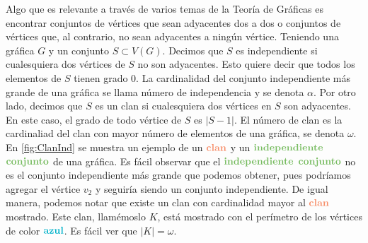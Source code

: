     Algo que es relevante a trav\'es de varios temas de la Teor\'ia de
     Gr\'aficas es encontrar conjuntos de v\'ertices que sean adyacentes dos a
     dos o conjuntos de v\'ertices que, al contrario, no sean adyacentes a
     ning\'un v\'ertice. Teniendo una gr\'afica $G$ y un conjunto $S \subset
     V(G)$. Decimos que $S$ es independiente si cualesquiera dos v\'ertices de
     $S$ no son adyacentes. Esto quiere decir que todos los elementos de $S$
     tienen grado $0$. La cardinalidad del conjunto independiente m\'as grande
     de una gr\'afica se llama n\'umero de independencia y se denota $\alpha$.
     Por otro lado, decimos que $S$ es un clan si cualesquiera dos v\'ertices en
     $S$ son adyacentes. En este caso, el grado de todo v\'ertice de $S$ es
     $|S-1|$. El n\'umero de clan es la cardinaliad del clan con mayor n\'umero
     de elementos de una gr\'afica, se denota $\omega$. En \cref{fig:ClanInd} se
     muestra un ejemplo de un ${\color{coral}\bf clan}$ y un ${\color{verde}\bf
     independiente}$ ${\color{verde}\bf conjunto }$ de una gr\'afica. Es f\'acil
     observar que el ${\color{verde}\bf independiente}$ ${\color{verde}\bf
     conjunto }$ no es el conjunto independiente m\'as grande que podemos
     obtener, pues podr\'iamos agregar el v\'ertice $v_2$ y seguir\'ia siendo un
     conjunto independiente. De igual manera, podemos notar que existe un clan con
     cardinalidad mayor al ${\color{coral}\bf clan}$ mostrado. Este clan,
     llam\'emoslo $K$, est\'a mostrado con el per\'imetro de los v\'ertices de
     color ${\color{azulCielo}\bf azul}$. Es f\'acil ver que $|K| = \omega$.


